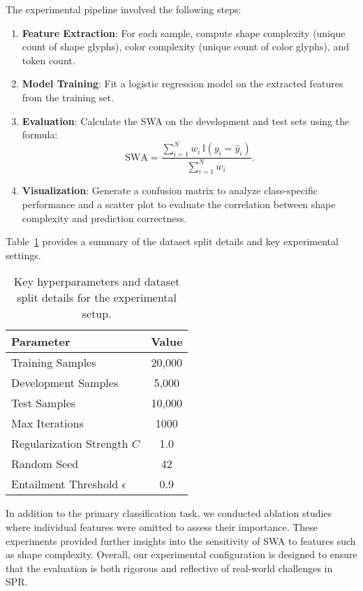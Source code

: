 \documentclass{article}
\begin{document}
The experimental pipeline involved the following steps:
\begin{enumerate}
    \item \textbf{Feature Extraction}: For each sample, compute shape complexity (unique count of shape glyphs), color complexity (unique count of color glyphs), and token count.
    \item \textbf{Model Training}: Fit a logistic regression model on the extracted features from the training set.
    \item \textbf{Evaluation}: Calculate the SWA on the development and test sets using the formula:
    \[
    \text{SWA} = \frac{\sum_{i=1}^{N} w_i \, \mathbb{I}(y_i = \hat{y}_i)}{\sum_{i=1}^{N} w_i}.
    \]
    \item \textbf{Visualization}: Generate a confusion matrix to analyze class-specific performance and a scatter plot to evaluate the correlation between shape complexity and prediction correctness.
\end{enumerate}

Table~\ref{tab:exp_hyper} provides a summary of the dataset split details and key experimental settings.

\begin{table}[ht]
\centering
\begin{tabular}{|l|c|}
\hline
\textbf{Parameter} & \textbf{Value} \\ \hline
Training Samples & 20,000 \\
Development Samples & 5,000 \\
Test Samples & 10,000 \\
Max Iterations & 1000 \\
Regularization Strength \(C\) & 1.0 \\
Random Seed & 42 \\
Entailment Threshold \(\epsilon\) & 0.9 \\ \hline
\end{tabular}
\caption{Key hyperparameters and dataset split details for the experimental setup.}
\label{tab:exp_hyper}
\end{table}

In addition to the primary classification task, we conducted ablation studies where individual features were omitted to assess their importance. These experiments provided further insights into the sensitivity of SWA to features such as shape complexity. Overall, our experimental configuration is designed to ensure that the evaluation is both rigorous and reflective of real-world challenges in SPR.
\end{document}
